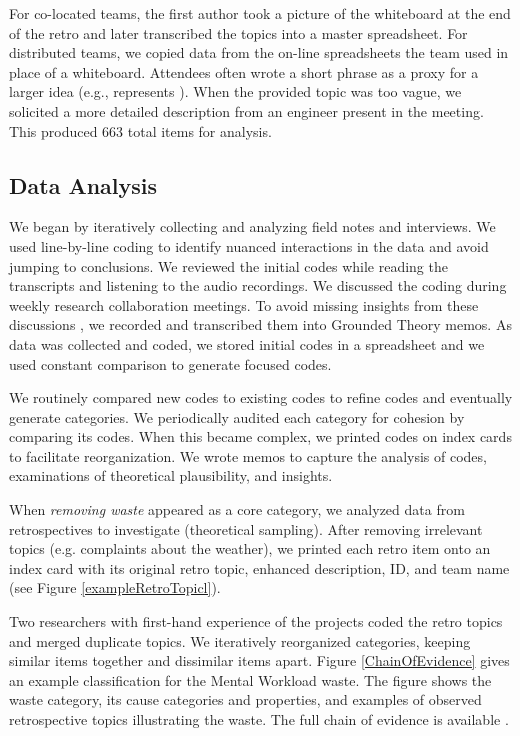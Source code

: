 For co-located teams, the first author took a picture of the whiteboard at the end of the retro and later transcribed the topics into a master spreadsheet. For distributed teams, we copied data from the on-line spreadsheets the team used in place of a whiteboard. Attendees often wrote a short phrase as a proxy for a larger idea (e.g.,   represents ). When the provided topic was too vague, we solicited a more detailed description from an engineer present in the meeting. This produced 663 total items for analysis. 
\subsection{Data Analysis}
We began by iteratively collecting and analyzing field notes and interviews. We used line-by-line coding \cite{Charmaz} to identify nuanced interactions in the data and avoid jumping to conclusions. We reviewed the initial codes while reading the transcripts and listening to the audio recordings. We discussed the coding during weekly research collaboration meetings. To avoid missing insights from these discussions \cite{GlaserTheoreticalSensitivity}, we recorded and transcribed them into Grounded Theory memos. As data was collected and coded, we stored initial codes in a spreadsheet and we used constant comparison to generate focused codes.

We routinely compared new codes to existing codes to refine codes and eventually generate categories. We periodically audited each category for cohesion by comparing its codes. When this became complex, we printed codes on index cards to facilitate reorganization. We wrote memos to capture the analysis of codes, examinations of theoretical plausibility, and insights.

When \textit{removing waste} appeared as a core category, we analyzed data from retrospectives to investigate (theoretical sampling). After removing irrelevant topics (e.g. complaints about the weather), we printed each retro item onto an index card with its original retro topic, enhanced description, ID, and team name (see Figure \ref{exampleRetroTopicl}).

Two researchers with first-hand experience of the projects coded the retro topics and merged duplicate topics. We iteratively reorganized categories, keeping similar items together and dissimilar items apart. Figure \ref{ChainOfEvidence} gives an example classification for the Mental Workload waste. The figure shows the waste category, its cause categories and properties, and examples of observed retrospective topics illustrating the waste. The full chain of evidence is available \cite{SedanoDissertation}. 


